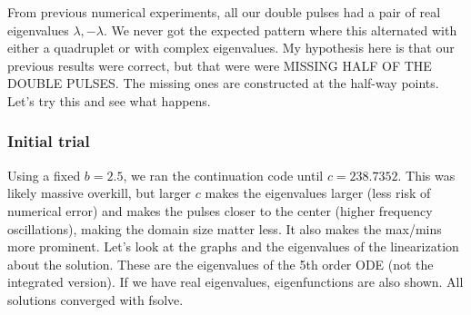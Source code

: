 \documentclass[12pt]{article}
\begin{document}
From previous numerical experiments, all our double pulses had a pair of real eigenvalues $\lambda, -\lambda$. We never got the expected pattern where this alternated with either a quadruplet or with complex eigenvalues. My hypothesis here is that our previous results were correct, but that were were MISSING HALF OF THE DOUBLE PULSES. The missing ones are constructed at the half-way points. Let's try this and see what happens.

\subsubsection*{Initial trial}
Using a fixed $b = 2.5$, we ran the continuation code until $c =  238.7352
$. This was likely massive overkill, but larger $c$ makes the eigenvalues larger (less risk of numerical error) and makes the pulses closer to the center (higher frequency oscillations), making the domain size matter less. It also makes the max/mins more prominent. Let's look at the graphs and the eigenvalues of the linearization about the solution. These are the eigenvalues of the 5th order ODE (not the integrated version). If we have real eigenvalues, eigenfunctions are also shown. All solutions converged with fsolve.
\end{document}
